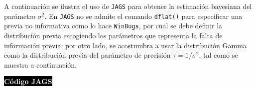 \begin{Eje}
    A continuaci\'on se ilustra el uso de \verb'JAGS' para obtener la estimaci\'on bayesiana del par\'ametro $\sigma^2$. En \verb'JAGS' no se admite el comando \verb'dflat()' para especificar una previa no informativa como lo hace \verb'WinBugs', por cual se debe definir la distribuci\'on previa escogiendo los par\'ametros que representa la falta de informaci\'on previa; por otro lado, se acostumbra a usar la distribuci\'on Gamma como la distribuci\'on previa del par\'ametro de precisi\'on $\tau=1/\sigma^2$, tal como se muestra a continuaci\'on.
    
    \colorbox{black}{\textcolor{white}{\textbf{C\'odigo JAGS}}}
\begin{knitrout}
\color{fgcolor}\begin{kframe}
\begin{alltt}
 \hlkwb{<-} \hlstd{()\{}
   \hlopt{:} 
\hlstd{\{}
 \hlopt{~} \hlstd{(}
\hlstd{\}}
 \hlkwb{<-} \hlopt{/}
 \hlopt{~} \hlstd{(}\hlstd{,} \hlstd{)}
\hlstd{\}}

 \hlkwb{<-} 
 \hlkwb{<-} \hlstd{(}\hlstd{,} \hlstd{,} \hlstd{,} \hlstd{,} \hlstd{,} \hlstd{,} \hlstd{,} \hlstd{,} \hlstd{,} \hlstd{,} \hlstd{,} \hlstd{)}

 \hlkwb{<-} \hlstd{(}\hlstd{,}\hlstd{)}
 \hlkwb{<-} \hlstd{(}\hlstd{)}
 \hlkwb{<-} \hlstd{()\{}
\hlstd{(}\hlstd{=}\hlstd{(}\hlstd{))}
\hlstd{\}}


\end{alltt}
\end{kframe}
\end{knitrout}
\end{Eje}
